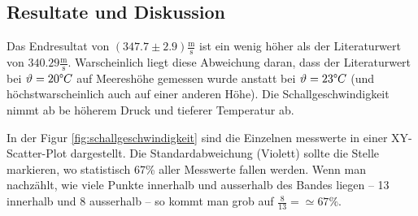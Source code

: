 \subsection{Resultate und Diskussion}

Das Endresultat von $(347.7\pm2.9)\frac{\textrm{m}}{\textrm{s}}$ ist ein wenig h\"oher als der
Literaturwert von $340.29 \frac{\textrm{m}}{\textrm{s}}$. Warscheinlich liegt diese Abweichung
daran, dass der Literaturwert bei $\vartheta=20\degree C$ auf Meeresh\"ohe gemessen wurde
anstatt bei $\vartheta=23\degree C$ (und h\"ochstwarscheinlich auch auf einer anderen H\"ohe). Die
Schallgeschwindigkeit nimmt ab be h\"oherem Druck und tieferer Temperatur ab.

In der Figur \ref{fig:schallgeschwindigkeit} sind die Einzelnen messwerte in einer XY-Scatter-Plot
dargestellt. Die Standardabweichung (Violett) sollte die Stelle markieren, wo statistisch 67\%
aller Messwerte fallen werden. Wenn man nachz\"ahlt, wie viele Punkte innerhalb und ausserhalb des
Bandes liegen -- 13 innerhalb und 8 ausserhalb -- so kommt man grob auf $\frac{8}{13}=\simeq67\textrm{\%}$.

